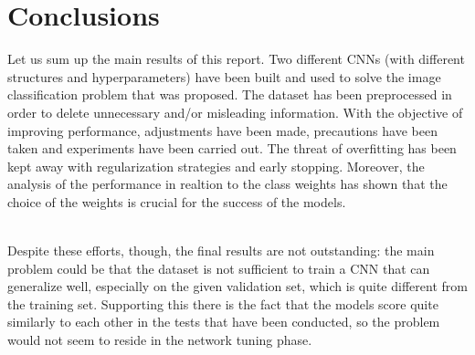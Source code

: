 \section{Conclusions}
Let us sum up the main results of this report. Two different CNNs (with different structures and hyperparameters) have been built and used to solve the image classification problem that was proposed. The dataset has been preprocessed in order to delete unnecessary and/or misleading information. With the objective of improving performance, adjustments have been made, precautions have been taken and experiments have been carried out. The threat of overfitting has been kept away with regularization strategies and early stopping.
Moreover, the analysis of the performance in realtion to the class weights has shown that the choice of the weights is crucial for the success of the models.

\noindent \\Despite these efforts, though, the final results are not outstanding: the main problem could be that the dataset is not sufficient to train a CNN that can generalize well, especially on the given validation set, which is quite different from the training set. Supporting this there is the fact that the models score quite similarly to each other in the tests that have been conducted, so the problem would not seem to reside in the network tuning phase.